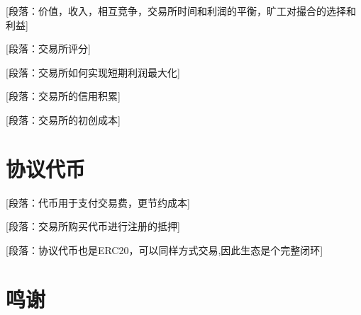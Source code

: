 \documentclass[UTF8,nofonts]{ctexart}
\begin{document}
[段落：价值，收入，相互竞争，交易所时间和利润的平衡，旷工对撮合的选择和利益]

[段落：交易所评分]

[段落：交易所如何实现短期利润最大化]

[段落：交易所的信用积累]

[段落：交易所的初创成本]


\section{协议代币\label{sec:exchangetoken}}

[段落：代币用于支付交易费，更节约成本]

[段落：交易所购买代币进行注册的抵押]

[段落：协议代币也是ERC20，可以同样方式交易,因此生态是个完整闭环]

\section{鸣谢\label{sec:acknowledgement}}



\end{document}
